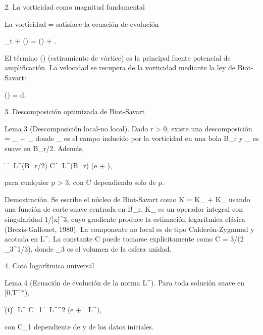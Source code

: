 \documentclass[12pt,a4paper]{book}
\begin{document}
2. La vorticidad como magnitud fundamental

La vorticidad \boldsymbol{\omega} = \nabla\times{} satisface la ecuación de evolución

\partial_t \boldsymbol{\omega} + (\cdot\nabla)\boldsymbol{\omega} = (\boldsymbol{\omega}\cdot\nabla) + \nu \Delta \boldsymbol{\omega}.

El término (\boldsymbol{\omega}\cdot\nabla) (estiramiento de vórtice) es la principal fuente potencial de amplificación. La velocidad se recupera de la vorticidad mediante la ley de Biot-Savart:

() =  \int {} d.

3. Descomposición optimizada de Biot-Savart

Lema 3 (Descomposición local-no local). Dado r > 0, existe una descomposición  = _{} + _{} donde _{} es el campo inducido por la vorticidad en una bola B_r y _{} es suave en B_{r/2}. Además,

\|\nabla {}_{}\|_{L^\infty(B_{r/2})} \le C \|\boldsymbol{\omega}\|_{L^\infty(B_r)} \log\left(e + \right),

para cualquier p > 3, con C dependiendo solo de p.

Demostración. Se escribe el núcleo de Biot-Savart como K = K_{} + K_{} usando una función de corte suave \chi centrada en B_r. K_{} es un operador integral con singularidad 1/|x|^3, cuyo gradiente produce la estimación logarítmica clásica (Brezis-Gallouet, 1980). La componente no local es de tipo Calderón-Zygmund y acotada en L^\infty. La constante C puede tomarse explícitamente como C = 3/(2 \omega_3^{1/3}), donde \omega_3 es el volumen de la esfera unidad.

4. Cota logarítmica universal

Lema 4 (Ecuación de evolución de la norma L^\infty). Para toda solución suave en [0,T^*),

 \|\boldsymbol{\omega}(t)\|_{L^\infty} \le C_1 \|\boldsymbol{\omega}\|_{L^\infty}^2 \log(e + \|\boldsymbol{\omega}\|_{L^\infty}),

con C_1 dependiente de \nu y de los datos iniciales.
\end{document}
